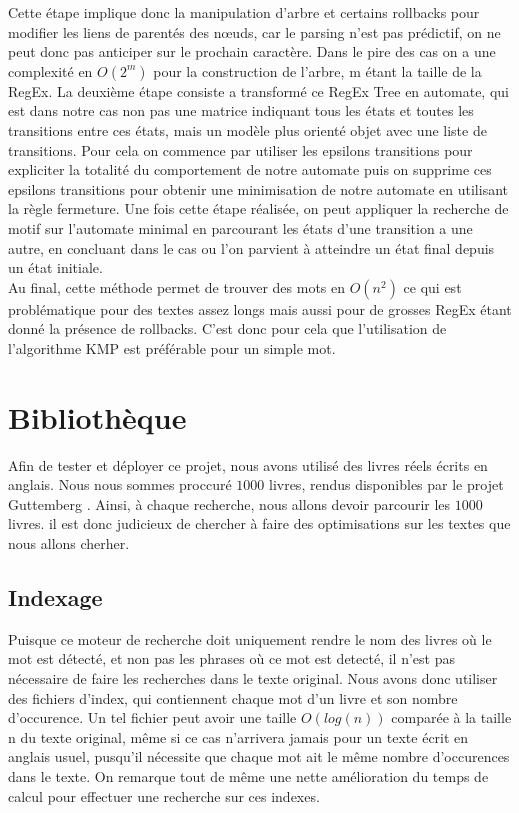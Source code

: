 \documentclass{article}
\begin{document}
Cette étape implique donc la manipulation d’arbre et certains rollbacks pour modifier les liens de parentés des nœuds, car le parsing n’est pas prédictif, on ne peut donc pas anticiper sur le prochain caractère. Dans le pire des cas on a une complexité en $O(2^m)$ pour la construction de l’arbre, m étant la taille de la RegEx. La deuxième étape consiste a transformé ce RegEx Tree en automate, qui est dans notre cas non pas une matrice indiquant tous les états et toutes les transitions entre ces états, mais un modèle plus orienté objet avec une liste de transitions. Pour cela on commence par utiliser les epsilons transitions pour expliciter la totalité du comportement de notre automate puis on supprime ces epsilons transitions pour obtenir une minimisation de notre automate en utilisant la règle fermeture. Une fois cette étape réalisée, on peut appliquer la recherche de motif sur l’automate minimal en parcourant les états d’une transition a une autre, en concluant dans le cas ou l’on parvient à atteindre un état final depuis un état initiale.\\
Au final, cette méthode permet de trouver des mots en $O(n^2)$ ce qui est problématique pour des textes assez longs mais aussi pour de grosses RegEx étant donné la présence de rollbacks. C'est donc pour cela que l'utilisation de l'algorithme KMP est préférable pour un simple mot.

\newpage

\section{Bibliothèque}

Afin de tester et déployer ce projet, nous avons utilisé des livres réels écrits en anglais. Nous nous sommes proccuré $1000$ livres, rendus disponibles par le projet Guttemberg \cite{Guttemberg}. Ainsi, à chaque recherche, nous allons devoir parcourir les $1000$ livres. il est donc judicieux de chercher à faire des optimisations sur les textes que nous allons cherher.

\subsection{Indexage}

Puisque ce moteur de recherche doit uniquement rendre le nom des livres où le mot est détecté, et non pas les phrases où ce mot est detecté, il n'est pas nécessaire de faire les recherches dans le texte original. Nous avons donc utiliser des fichiers d'index, qui contiennent chaque mot d'un livre et son nombre d'occurence. Un tel fichier peut avoir une taille $O(log(n))$ comparée à la taille n du texte original, même si ce cas n'arrivera jamais pour un texte écrit en anglais usuel, pusqu'il nécessite que chaque mot ait le même nombre d'occurences dans le texte. On remarque tout de même une nette amélioration du temps de calcul pour effectuer une recherche sur ces indexes.\\
\end{document}
